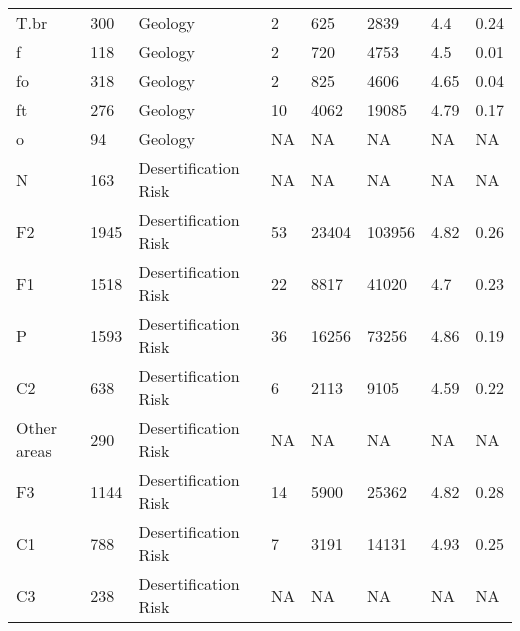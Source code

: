 \begin{sidewaystable*}
\begin{tabular*}{\textwidth}{@{\extracolsep{\fill}}llllllll@{\extracolsep{\fill}}}
T.br                                            & 300  & Geology              & 2       & 625            & 2839          & 4.4           & 0.24        \\
f                                               & 118  & Geology              & 2       & 720            & 4753          & 4.5           & 0.01        \\
fo                                              & 318  & Geology              & 2       & 825            & 4606          & 4.65          & 0.04        \\
ft                                              & 276  & Geology              & 10      & 4062           & 19085         & 4.79          & 0.17        \\
o                                               & 94   & Geology              & NA      & NA             & NA            & NA            & NA          \\
N                                               & 163  & Desertification Risk & NA      & NA             & NA            & NA            & NA          \\
F2                                              & 1945 & Desertification Risk & 53      & 23404          & 103956        & 4.82          & 0.26        \\
F1                                              & 1518 & Desertification Risk & 22      & 8817           & 41020         & 4.7           & 0.23        \\
P                                               & 1593 & Desertification Risk & 36      & 16256          & 73256         & 4.86          & 0.19        \\
C2                                              & 638  & Desertification Risk & 6       & 2113           & 9105          & 4.59          & 0.22        \\
Other areas                                     & 290  & Desertification Risk & NA      & NA             & NA            & NA            & NA          \\
F3                                              & 1144 & Desertification Risk & 14      & 5900           & 25362         & 4.82          & 0.28        \\
C1                                              & 788  & Desertification Risk & 7       & 3191           & 14131         & 4.93          & 0.25        \\
C3                                              & 238  & Desertification Risk & NA      & NA             & NA            & NA            & NA          \\

\end{tabular*}
\end{sidewaystable*}
